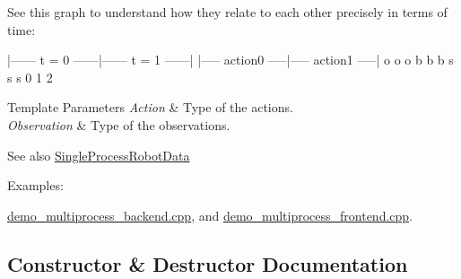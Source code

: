 See this graph to understand how they relate to each other precisely in terms of time\+:

\begin{DoxyVerb}|------ t = 0 ------|------ t = 1 ------|
|----- action0 -----|----- action1 -----|
o                   o                   o
b                   b                   b
s                   s                   s
0                   1                   2
\end{DoxyVerb}



\begin{DoxyTemplParams}{Template Parameters}
{\em Action} & Type of the actions. \\
\hline
{\em Observation} & Type of the observations. \\
\hline
\end{DoxyTemplParams}
\begin{DoxySeeAlso}{See also}
\hyperlink{classrobot__interfaces_1_1SingleProcessRobotData}{Single\+Process\+Robot\+Data} 
\end{DoxySeeAlso}
\begin{Desc}
\item[Examples\+: ]\par
\hyperlink{demo_multiprocess_backend_8cpp-example}{demo\+\_\+multiprocess\+\_\+backend.\+cpp}, and \hyperlink{demo_multiprocess_frontend_8cpp-example}{demo\+\_\+multiprocess\+\_\+frontend.\+cpp}.\end{Desc}


\subsection{Constructor \& Destructor Documentation}
\mbox{\label{classrobot__interfaces_1_1MultiProcessRobotData_a27bb5ee187ceacb386d89c828481b057}} 
